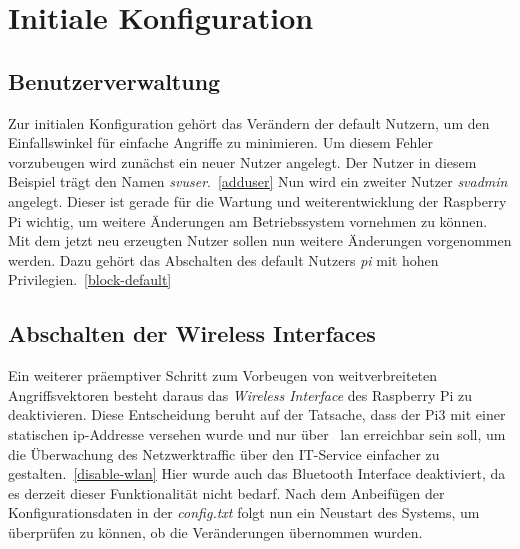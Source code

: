 
\section{Initiale Konfiguration}\label{sec:initiale-konfiguration}
\subsection{Benutzerverwaltung}\label{subsec: benutzerverwaltung}
Zur initialen Konfiguration gehört das Verändern der default Nutzern, um den Einfallswinkel für einfache Angriffe zu minimieren.
Um diesem Fehler vorzubeugen wird zunächst ein neuer Nutzer angelegt.
Der Nutzer in diesem Beispiel trägt den Namen \textit{svuser}.~\ref{adduser}
Nun wird ein zweiter Nutzer \textit{svadmin} angelegt.
Dieser ist gerade für die Wartung und weiterentwicklung der Raspberry Pi wichtig, um weitere Änderungen am Betriebssystem vornehmen zu können. \\
\blankline
Mit dem jetzt neu erzeugten Nutzer sollen nun weitere Änderungen vorgenommen werden.
Dazu gehört das Abschalten des default Nutzers \textit{pi} mit hohen Privilegien.~\ref{block-default} \\
\blankline
\subsection{Abschalten der Wireless Interfaces}\label{subsec:abschalten-des-wireless-interface}
Ein weiterer präemptiver Schritt zum Vorbeugen von weitverbreiteten Angriffsvektoren besteht daraus das \textit{Wireless Interface} des Raspberry Pi zu deaktivieren.
Diese Entscheidung beruht auf der Tatsache, dass der Pi3 mit einer statischen \gls{ip}-Addresse versehen wurde und nur über ~\gls{lan} erreichbar sein soll, um die Überwachung
des Netzwerktraffic über den IT-Service einfacher zu gestalten.~\ref{disable-wlan}
Hier wurde auch das Bluetooth Interface deaktiviert, da es derzeit dieser Funktionalität nicht bedarf.
Nach dem Anbeifügen der Konfigurationsdaten in der \textit{config.txt} folgt nun ein Neustart des Systems, um überprüfen zu können, ob die Veränderungen übernommen wurden.
